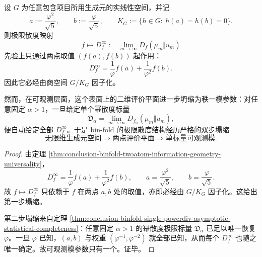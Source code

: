 \begin{theorem}[极限散度锥的两步塌缩与可观测秩一刚性]\label{thm:conclusion-binfold-divergence-cone-observable-rank-one}
设 \(G\) 为任意包含项目所用生成元的实线性空间，并记
\[
a:=\frac{\varphi^2}{\sqrt5},
\qquad
b:=\frac{\varphi}{\sqrt5},
\qquad
K_G:=\{h\in G:\ h(a)=h(b)=0\}.
\]
则极限散度映射
\[
f\longmapsto D_f^\infty:=\lim_{m\to\infty}D_f(\mu_m\Vert u_m)
\]
先验上只通过两点取值 \((f(a),f(b))\) 起作用：
\[
D_f^\infty=\frac{1}{\varphi}f(a)+\frac{1}{\varphi^2}f(b).
\]
因此它必经由商空间 \(G/K_G\) 因子化。

然而，在可观测层面，这个表面上的二维评价平面进一步坍缩为秩一模参数：对任意固定 \(\alpha>1\)，一旦给定单个幂散度标量
\[
\mathfrak D_\alpha=\lim_{m\to\infty}D_{f_\alpha}(\mu_m\Vert u_m),
\]
便自动给定全部 \(D_f^\infty\)。于是 bin-fold 的极限散度结构经历严格的双步塌缩
\[
\text{无限维生成元空间}
\Longrightarrow
\text{两点评价平面}
\Longrightarrow
\text{单标量可观测模}.
\]
\end{theorem}
\begin{proof}
由定理 \ref{thm:conclusion-binfold-twoatom-information-geometry-universality}，
\[
D_f^\infty=\frac{1}{\varphi}f(a)+\frac{1}{\varphi^2}f(b),
\qquad
a=\frac{\varphi^2}{\sqrt5},
\qquad
b=\frac{\varphi}{\sqrt5}.
\]
故 \(f\mapsto D_f^\infty\) 只依赖于 \(f\) 在两点 \(a,b\) 处的取值，亦即必经由 \(G/K_G\) 因子化。这给出第一步塌缩。

第二步塌缩来自定理 \ref{thm:conclusion-binfold-single-powerdiv-asymptotic-statistical-completeness}：任意固定 \(\alpha>1\) 的幂散度极限标量 \(\mathfrak D_\alpha\) 已足以唯一恢复 \(\varphi\)。一旦 \(\varphi\) 已知，\((a,b)\) 与权重 \((\varphi^{-1},\varphi^{-2})\) 就全部已知，从而每个 \(D_f^\infty\) 也随之唯一确定。故可观测模参数只有一个。证毕。
\end{proof}

